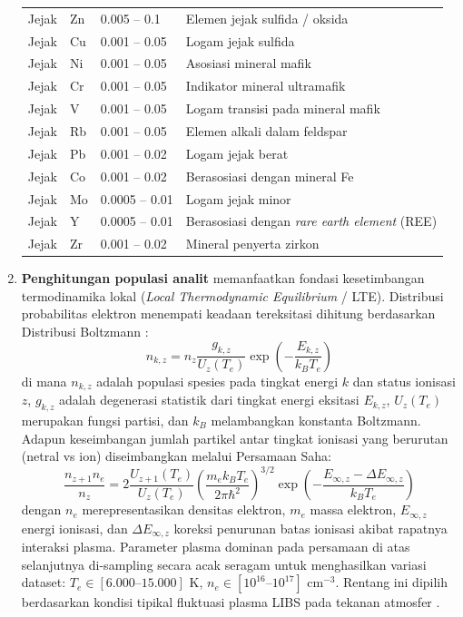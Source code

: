 \documentclass[12pt, a4paper]{article}
\begin{document}
\begin{enumerate}[label=\arabic*., leftmargin=2cm]
\begin{table}[htbp]
\begin{tabular}{lllp{6cm}}
Jejak & Zn & 0.005 -- 0.1 & Elemen jejak sulfida / oksida \\
Jejak & Cu & 0.001 -- 0.05 & Logam jejak sulfida \\
Jejak & Ni & 0.001 -- 0.05 & Asosiasi mineral mafik \\
Jejak & Cr & 0.001 -- 0.05 & Indikator mineral ultramafik \\
Jejak & V & 0.001 -- 0.05 & Logam transisi pada mineral mafik \\
Jejak & Rb & 0.001 -- 0.05 & Elemen alkali dalam feldspar \\
Jejak & Pb & 0.001 -- 0.02 & Logam jejak berat \\
Jejak & Co & 0.001 -- 0.02 & Berasosiasi dengan mineral Fe \\
Jejak & Mo & 0.0005 -- 0.01 & Logam jejak minor \\
Jejak & Y & 0.0005 -- 0.01 & Berasosiasi dengan \textit{rare earth element} (REE) \\
Jejak & Zr & 0.001 -- 0.02 & Mineral penyerta zirkon \\
\bottomrule
\end{tabular}
\end{table}

    \item \textbf{Penghitungan populasi analit} memanfaatkan fondasi kesetimbangan termodinamika lokal (\textit{Local Thermodynamic Equilibrium} / LTE). Distribusi probabilitas elektron menempati keadaan tereksitasi dihitung berdasarkan Distribusi Boltzmann \cite{fujimoto2004}:
    \begin{equation}
        n_{k,z} = n_z \frac{g_{k,z}}{U_z(T_e)} \exp\left(-\frac{E_{k,z}}{k_B T_e}\right)
        \label{eq:boltzmann}
    \end{equation}
    di mana $n_{k,z}$ adalah populasi spesies pada tingkat energi $k$ dan status ionisasi $z$, $g_{k,z}$ adalah degenerasi statistik dari tingkat energi eksitasi $E_{k,z}$, $U_z(T_e)$ merupakan fungsi partisi, dan $k_B$ melambangkan konstanta Boltzmann. Adapun keseimbangan jumlah partikel antar tingkat ionisasi yang berurutan (netral vs ion) diseimbangkan melalui Persamaan Saha:
    \begin{equation}
        \frac{n_{z+1} n_e}{n_z} = 2 \frac{U_{z+1}(T_e)}{U_z(T_e)} \left(\frac{m_e k_B T_e}{2\pi \hbar^2}\right)^{3/2} \exp\left(-\frac{E_{\infty,z}-\Delta E_{\infty,z}}{k_B T_e}\right)
        \label{eq:saha}
    \end{equation}
    dengan $n_e$ merepresentasikan densitas elektron, $m_e$ massa elektron, $E_{\infty,z}$ energi ionisasi, dan $\Delta E_{\infty,z}$ koreksi penurunan batas ionisasi akibat rapatnya interaksi plasma. Parameter plasma dominan pada persamaan di atas selanjutnya di-sampling secara acak seragam untuk menghasilkan variasi dataset: $T_e \in [6.000\text{--}15.000]$ K, $n_e \in [10^{16}\text{--}10^{17}]$ cm$^{-3}$. Rentang ini dipilih berdasarkan kondisi tipikal fluktuasi plasma LIBS pada tekanan atmosfer \cite{cristoforetti2010}.


\end{enumerate}
\end{document}
